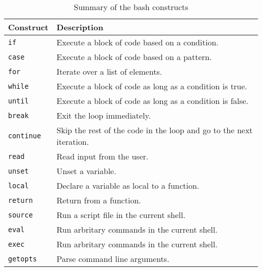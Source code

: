 \begin{table*}[h!]
  \caption{Summary of the bash constructs}
  \begin{tabular}{ll}
    \toprule
    \textbf{Construct} & \textbf{Description} \\
    \midrule
    \lstinline|if| & Execute a block of code based on a condition. \\
    \lstinline|case| & Execute a block of code based on a pattern. \\
    \lstinline|for| & Iterate over a list of elements. \\
    \lstinline|while| & Execute a block of code as long as a condition is true. \\
    \lstinline|until| & Execute a block of code as long as a condition is false. \\
    \lstinline|break| & Exit the loop immediately. \\
    \lstinline|continue| & Skip the rest of the code in the loop and go to the next iteration. \\
    \lstinline|read| & Read input from the user. \\
    \lstinline|unset| & Unset a variable. \\
    \lstinline|local| & Declare a variable as local to a function. \\
    \lstinline|return| & Return from a function. \\
    \lstinline|source| & Run a script file in the current shell. \\
    \lstinline|eval| & Run arbritary commands in the current shell. \\
    \lstinline|exec| & Run arbritary commands in the current shell. \\
    \lstinline|getopts| & Parse command line arguments. \\
    \bottomrule
  \end{tabular}
\end{table*}
